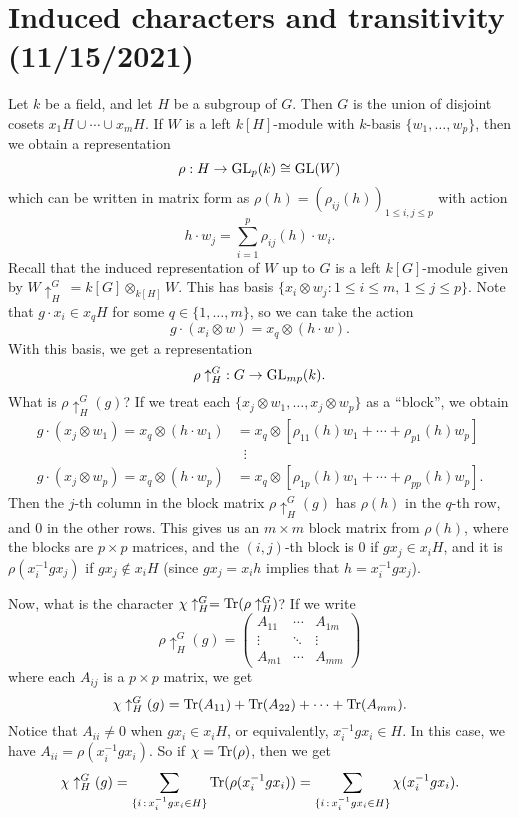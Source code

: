 \section{Induced characters and transitivity (11/15/2021)}
Let $k$ be a field, and let $H$ be a subgroup of $G$. Then $G$ is the 
union of disjoint cosets $x_1H \cup \cdots \cup x_mH$. If $W$ is a 
left $k[H]$-module with $k$-basis $\{w_1, \dots, w_p\}$, then we obtain 
a representation
\[ \rho : H \to \operatorname{GL}_p(k) \cong \operatorname{GL}(W) \] 
which can be written in matrix form as $\rho(h) = (\rho_{ij}(h))_{1\leq i,j\leq p}$
with action 
\[ h \cdot w_j = \sum_{i=1}^p \rho_{ij}(h) \cdot w_i. \] 
Recall that the induced representation of $W$ up to $G$ is a left $k[G]$-module 
given by $W \uparrow_H^G\,= k[G] \otimes_{k[H]} W$. This has basis 
$\{x_i \otimes w_j : 1 \leq i \leq m,\, 1 \leq j \leq p\}$. Note that 
$g \cdot x_i \in x_qH$ for some $q \in \{1, \dots, m\}$, so we can take the action 
\[ g \cdot (x_i \otimes w) = x_q \otimes (h \cdot w). \] 
With this basis, we get a representation 
\[ \rho \uparrow_H^G\;: G \to \operatorname{GL}_{mp}(k). \] 
What is $\rho \uparrow_H^G(g)$? If we treat each $\{x_j \otimes w_1, \dots, 
x_j \otimes w_p\}$ as a ``block'', we obtain 
\begin{align*}
    g \cdot (x_j \otimes w_1) = x_q \otimes (h \cdot w_1) &= 
    x_q \otimes [\rho_{11}(h) w_1 + \cdots + \rho_{p1}(h) w_p] \\ 
    &\;\;\vdots \\ 
    g \cdot (x_j \otimes w_p) = x_q \otimes (h \cdot w_p) &= 
    x_q \otimes [\rho_{1p}(h) w_1 + \cdots + \rho_{pp}(h) w_p]. 
\end{align*}
Then the $j$-th column in the block matrix $\rho \uparrow_H^G(g)$ has 
$\rho(h)$ in the $q$-th row, and $0$ in the other rows. This gives us 
an $m \times m$ block matrix from $\rho(h)$, where the blocks are 
$p \times p$ matrices, and the $(i, j)$-th block is $0$ if $gx_j \in x_i H$, 
and it is $\rho(x_i^{-1}gx_j)$ if $gx_j \notin x_i H$ (since 
$gx_j = x_ih$ implies that $h = x_i^{-1}gx_j$).

Now, what is the character $\chi \uparrow_H^G = \operatorname{Tr}(\rho \uparrow_H^G)$? 
If we write 
\[ \rho \uparrow_H^G(g) = \begin{pmatrix}
    A_{11} & \cdots & A_{1m} \\ 
    \vdots & \ddots & \vdots \\ 
    A_{m1} & \cdots & A_{mm}
\end{pmatrix} \] 
where each $A_{ij}$ is a $p \times p$ matrix, we get 
\[ \chi \uparrow_H^G(g) = \operatorname{Tr}(A_{11}) + \operatorname{Tr}(A_{22}) + \cdots + \operatorname{Tr}(A_{mm}). \] 
Notice that $A_{ii} \neq 0$ when $gx_i \in x_iH$, or equivalently, 
$x_i^{-1}gx_i \in H$. In this case, we have $A_{ii} = \rho(x_i^{-1}gx_i)$. 
So if $\chi = \operatorname{Tr}(\rho)$, then we get 
\[ \chi \uparrow_H^G(g) = \sum_{\{i\,:\,x_i^{-1}gx_i \in H\}} 
\operatorname{Tr}(\rho(x_i^{-1}gx_i)) = \sum_{\{i\,:\,x_i^{-1}gx_i \in H\}} \chi(x_i^{-1}gx_i). \] 

